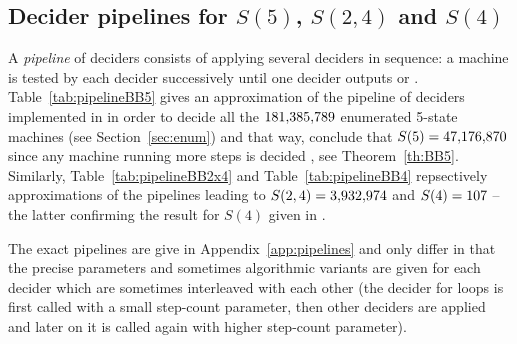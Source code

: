 \subsection{Decider pipelines for $S(5)$, $S(2,4)$ and $S(4)$}\label{sec:pipelines}
A \textit{pipeline} of deciders consists of applying several deciders in sequence: a machine is tested by each decider successively until one decider outputs \HALT or \NONHALT. Table~\ref{tab:pipelineBB5} gives an approximation of the pipeline of deciders implemented in \CoqBB in order to decide all the $181{,}385{,}789$ enumerated 5-state machines (see Section~\ref{sec:enum}) and that way, conclude that $S(5) = 47{,}176{,}870$ since any machine running more steps is decided \NONHALT, see Theorem~\ref{th:BB5}. Similarly, Table~\ref{tab:pipelineBB2x4} and Table~\ref{tab:pipelineBB4} repsectively approximations of the pipelines leading to $S(2,4) = 3{,}932{,}974$ and $S(4) = 107$ -- the latter confirming the result for $S(4)$ given in \cite{Brady83}.

The exact pipelines are give in Appendix~\ref{app:pipelines} and only differ in that the precise parameters and sometimes algorithmic variants are given for each decider which are sometimes interleaved with each other (\eg the decider for loops is first called with a small step-count parameter, then other deciders are applied and later on it is called again with higher step-count parameter).


